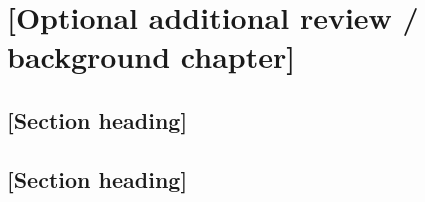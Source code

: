 \chapter{[Optional additional review / background chapter]}
\label{chap:background}


\section{[Section heading]}

\section{[Section heading]}
